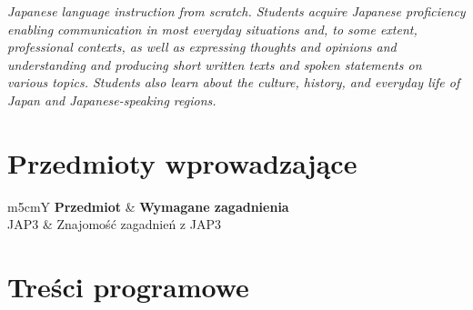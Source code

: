 \documentclass[12pt, a4paper]{article}
\newcommand{\thdrule}{\noalign{\global\setlength{\extrarowheight}{0pt}}}
\newcommand{\thdend}{\noalign{\global\setlength{\extrarowheight}{3pt}}}
\begin{document}
\textit{Japanese language instruction from scratch. Students acquire Japanese proficiency enabling communication in most everyday situations and, to some extent, professional contexts, as well as expressing thoughts and opinions and understanding and producing short written texts and spoken statements on various topics. Students also learn about the culture, history, and everyday life of Japan and Japanese-speaking regions.}


\section{Przedmioty wprowadzające}

{\scriptsize
\begin{tabularx}{\textwidth}{m{5cm}Y}
\thdrule\toprule
{} {\color{white}\textbf{Przedmiot}} & {\color{white}\textbf{Wymagane zagadnienia}} \\
\midrule\thdend
   JAP3 & Znajomość zagadnień z JAP3 \\
\bottomrule
\end{tabularx}}

\section{Treści programowe}
\end{document}
